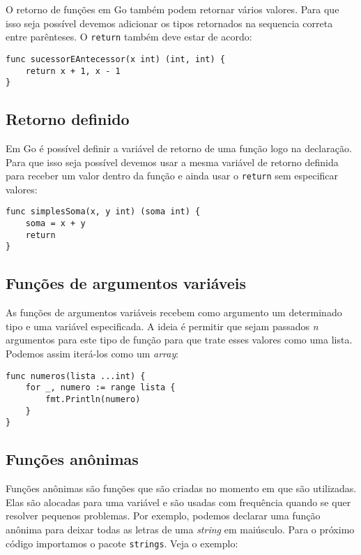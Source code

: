 \documentclass{SBCbookchapter}
\begin{document}
O retorno de funções em Go também podem retornar vários valores. Para que isso seja possível devemos adicionar os tipos retornados na sequencia correta entre parênteses. O \texttt{return} também deve estar de acordo:

\begin{lstlisting}
func sucessorEAntecessor(x int) (int, int) {
	return x + 1, x - 1
}
\end{lstlisting}

\subsection{Retorno definido}

Em Go é possível definir a variável de retorno de uma função logo na declaração. Para que isso seja possível devemos usar a mesma variável de retorno definida para receber um valor dentro da função e ainda usar o \texttt{return} sem especificar valores:

\begin{lstlisting}
func simplesSoma(x, y int) (soma int) {
	soma = x + y
	return
}
\end{lstlisting}

\subsection{Funções de argumentos variáveis}

As funções de argumentos variáveis recebem como argumento um determinado tipo e uma variável especificada. A ideia é permitir que sejam passados \textit{n} argumentos para este tipo de função para que trate esses valores como uma lista. Podemos assim iterá-los como um \textit{array}:

\begin{lstlisting}
func numeros(lista ...int) {
	for _, numero := range lista {
		fmt.Println(numero)
	}
}
\end{lstlisting}

\subsection{Funções anônimas}

Funções anônimas são funções que são criadas no momento em que são utilizadas. Elas são alocadas para uma variável e são usadas com frequência quando se quer resolver pequenos problemas. Por exemplo, podemos declarar uma função anônima para deixar todas as letras de uma \textit{string} em maiúsculo. Para o próximo código importamos o pacote \texttt{strings}. Veja o exemplo:
\end{document}
